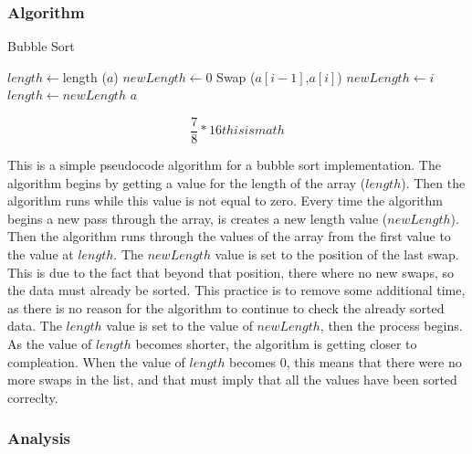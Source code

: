 \documentclass{subfile}
\begin{document}
\begin{multicols}{2}
     \subsubsection{Algorithm}\label{ssub:algorithm}
     \begin{algorithm}[H]
       \caption{Bubble Sort}\label{alg:bubble_sort}
       \begin{algorithmic}
           \State $length \gets $length ($a$)
             \State $newLength \gets 0$
                 \State Swap ($a[i-1]$,$a[i]$)
                 \State $newLength \gets i$
               \EndIf
             \EndFor
             \State $length\gets newLength$
           \EndWhile
           \State \Return $a$
         \EndFunction
       \end{algorithmic}
     \end{algorithm}

     \begin{equation}
       \frac{7}{8} * 16
       this is math
     \end{equation}

     This is a simple pseudocode algorithm for a bubble sort implementation.
     The algorithm begins by getting a value for the length of the array
     ($length$). Then the algorithm runs while this value is not equal to zero.
     Every time the algorithm begins a new pass through the array, is creates a
     new length value ($newLength$). Then the algorithm runs through the values
     of the array from the first value to the value at $length$. The
     $newLength$ value is set to the position of the last swap. This is due to
     the fact that beyond that position, there where no new swaps, so the data
     must already be sorted. This practice is to remove some additional time,
     as there is no reason for the algorithm to continue to check the already
     sorted data. The $length$ value is set to the value of $newLength$, then
     the process begins. As the value of $length$ becomes shorter, the
     algorithm is getting closer to compleation. When the value of $length$
     becomes $0$, this means that there were no more swaps in the list, and
     that must imply that all the values have been sorted correclty.

     \subsubsection{Analysis}\label{ssub:analysis}


\end{multicols}
\end{document}
